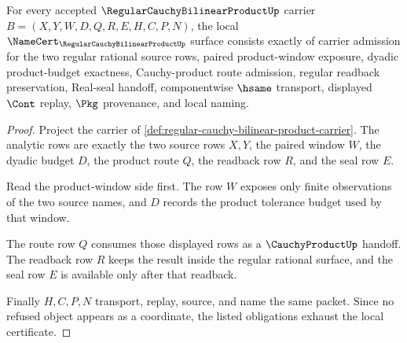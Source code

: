 \begin{theorem}
\label{thm:regular-cauchy-bilinear-product-namecert-obligations}
For every accepted $\RegularCauchyBilinearProductUp$ carrier $B=(X,Y,W,D,Q,R,E,H,C,P,N)$, the local $\NameCert_{\RegularCauchyBilinearProductUp}$ surface consists exactly of carrier admission for the two regular rational source rows, paired product-window exposure, dyadic product-budget exactness, Cauchy-product route admission, regular readback preservation, Real-seal handoff, componentwise $\hsame$ transport, displayed $\Cont$ replay, $\Pkg$ provenance, and local naming.
\end{theorem}
\begin{proof}
Project the carrier of \autoref{def:regular-cauchy-bilinear-product-carrier}. The analytic rows are exactly the two source rows $X,Y$, the paired window $W$, the dyadic budget $D$, the product route $Q$, the readback row $R$, and the seal row $E$.

Read the product-window side first. The row $W$ exposes only finite observations of the two source names, and $D$ records the product tolerance budget used by that window.

The route row $Q$ consumes those displayed rows as a $\CauchyProductUp$ handoff. The readback row $R$ keeps the result inside the regular rational surface, and the seal row $E$ is available only after that readback.

Finally $H,C,P,N$ transport, replay, source, and name the same packet. Since no refused object appears as a coordinate, the listed obligations exhaust the local certificate.
\end{proof}

